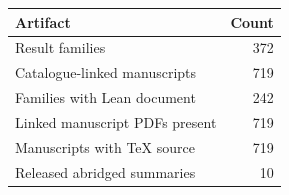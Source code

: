 \begin{tabular}{lr}
\toprule
Artifact & Count \\
\midrule
Result families & 372 \\
Catalogue-linked manuscripts & 719 \\
Families with Lean document & 242 \\
Linked manuscript PDFs present & 719 \\
Manuscripts with TeX source & 719 \\
Released abridged summaries & 10 \\
\bottomrule
\end{tabular}
